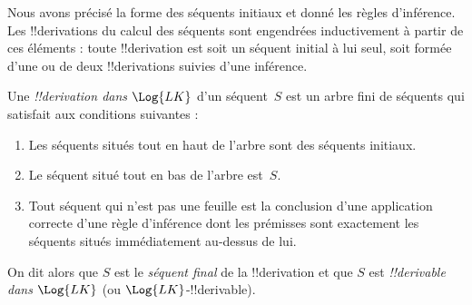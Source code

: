 \documentclass[../../../include/open-logic-section]{subfiles}
\begin{document}
      {}
      {}


\begin{explain}
Nous avons précisé la forme des séquents initiaux et donné les règles
d'inférence. Les !!{derivation}s du calcul des séquents sont
engendrées inductivement à partir de ces éléments : toute
!!{derivation} est soit un séquent initial à lui seul, soit formée
d'une ou de deux !!{derivation}s suivies d'une inférence.
\end{explain}

\begin{defn}
Une \emph{!!{derivation} dans $\Log{LK}$} d'un séquent~$S$ est un
arbre fini de séquents qui satisfait aux conditions suivantes :
\begin{enumerate}
\item Les séquents situés tout en haut de l'arbre sont des séquents initiaux.
\item Le séquent situé tout en bas de l'arbre est~$S$.
\item Tout séquent qui n'est pas une feuille est la conclusion d'une
  application correcte d'une règle d'inférence dont les prémisses
  sont exactement les séquents situés immédiatement au-dessus de lui.
\end{enumerate}
On dit alors que $S$ est le \emph{séquent final} de la
!!{derivation} et que $S$ est \emph{!!{derivable} dans $\Log{LK}$}
(ou $\Log{LK}$-!!{derivable}).
\end{defn}
\end{document}
